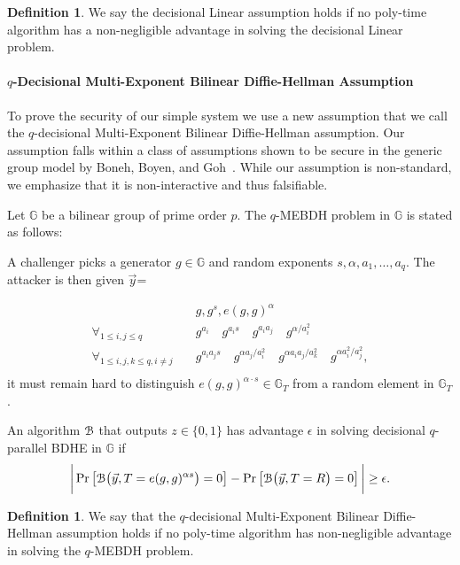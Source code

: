 \documentclass[a4paper, 11pt]{article}
\newtheorem{definition}[theorem]{Definition}
\newcommand{\G}{\ensuremath{\mathbb{G}}}
\theoremstyle{definition}
\newtheorem{definition}[theorem]{Definition}
\newcommand{\e}{\epsilon}
\newcommand{\AlgB}{\ensuremath{{\cal B}}}
\begin{document}
\begin{definition} We say the decisional Linear assumption holds if no poly-time algorithm has a non-negligible advantage in solving the decisional Linear problem.
\end{definition}

\paragraph{$q$-Decisional Multi-Exponent Bilinear Diffie-Hellman Assumption} To prove the security of our simple system we use a new assumption that we call the
$q$-decisional Multi-Exponent Bilinear Diffie-Hellman
assumption. Our assumption falls within a class of
assumptions shown to be secure in the generic group model by Boneh, Boyen, and Goh~\cite{BBG05}.
While our assumption is non-standard, we emphasize that it is non-interactive and
thus falsifiable.

Let $\G$ be a bilinear group of prime order $p$. The $q$-MEBDH problem
in $\G$ is stated as follows:

A challenger picks a generator  $g \in \G$ and random exponents
$s,\alpha, a_1, \ldots, a_q$. The attacker is then given $\vec{y}$=

\begin{eqnarray*}
  & g, g^s, e(g,g)^{\alpha} \\
\forall_{1 \leq i,j \leq q}  \quad &
      g^{a_i} \quad g^{a_i s} \quad g^{a_i a_j} \quad g^{\alpha/a_i^2}\\
\forall_{1 \leq i,j,k \leq q, i \neq j } \quad &
      g^{a_i a_j s} \quad g^{\alpha a_j/ a_i^2} \quad
      g^{\alpha a_i a_j / a_k^2} \quad g^{\alpha a_i^2 / a_j^2}, \\
\end{eqnarray*}
it must remain hard to  distinguish
$e(g,g)^{\alpha \cdot s} \in \G_T$ from a random element in $\G_T$.


An algorithm $\AlgB$ that outputs $z\in \{0,1\}$ has advantage $\e$ in
solving decisional $q$-parallel BDHE in $\G$ if
\begin{eqnarray*}
\bigg| \Pr\left[   \AlgB\big(\vec{y},
                                    T=e(g,g)^{\alpha s}\big) = 0 \right] -
       \Pr\left[   \AlgB\big(\vec{y},
                                    T=R \big) = 0 \right] \bigg| \geq \e.
\end{eqnarray*}


\begin{definition}
We say that the $q$-decisional Multi-Exponent Bilinear Diffie-Hellman
assumption holds if no poly-time algorithm has non-negligible advantage
in solving the $q$-MEBDH problem.
\end{definition}
\end{document}
